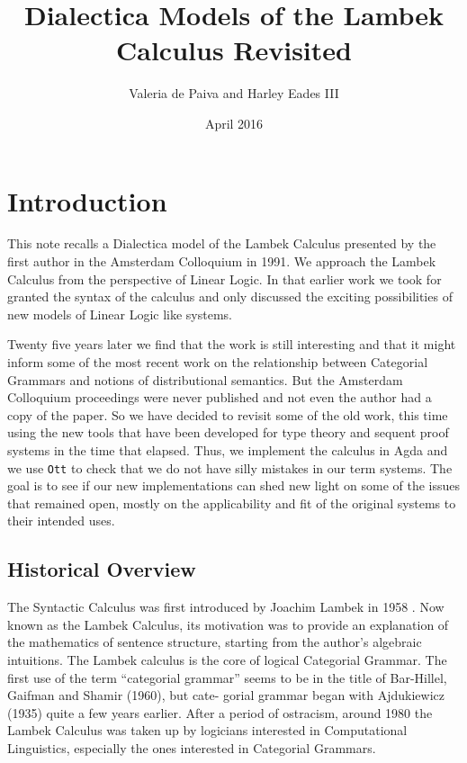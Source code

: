 \documentclass{article}
\title{Dialectica Models of the Lambek Calculus Revisited}
\author{Valeria de Paiva and Harley Eades III}
\date{April 2016}
\begin{document}
\maketitle

\section*{Introduction}

This note recalls a Dialectica model of the Lambek Calculus presented
by the first author in the Amsterdam Colloquium in 1991. We approach the
Lambek Calculus from the perspective of Linear Logic. In that earlier
work we took for granted the syntax of the calculus and only discussed the
exciting possibilities of new models of Linear Logic like systems.

Twenty five years later we find that the work is still interesting and
that it might inform some of the most recent work on the relationship between Categorial Grammars and notions of distributional semantics. But
the Amsterdam Colloquium proceedings were never published and not even
the author had a copy of the paper. So we have decided to revisit some
of the old work, this time using the new tools that have been
developed for type theory and sequent proof systems in the time that
elapsed. Thus, we implement the calculus in Agda and we use
\texttt{Ott} \cite{Sewell:2010} to check that we do not have silly
mistakes in our term systems. The goal is to see if our new
implementations can shed new light on some of the issues that remained
open, mostly on the applicability and fit of the original systems to their intended uses.

\subsection*{Historical Overview}
The Syntactic Calculus was first introduced by Joachim Lambek in 1958
\cite{Lambek1958}. Now known as the Lambek Calculus, its motivation was to provide an explanation of the mathematics of sentence structure, starting from the author's algebraic intuitions. The Lambek calculus is  the core of logical Categorial Grammar. 
The first use of the term “categorial grammar”
seems to be in the title of Bar-Hillel, Gaifman and Shamir (1960), but cate-
gorial grammar began with Ajdukiewicz (1935) quite a few years earlier. After a  period of ostracism, around 1980 the Lambek Calculus was taken up by logicians interested in Computational Linguistics, especially the ones
interested in Categorial Grammars. %
\end{document}
